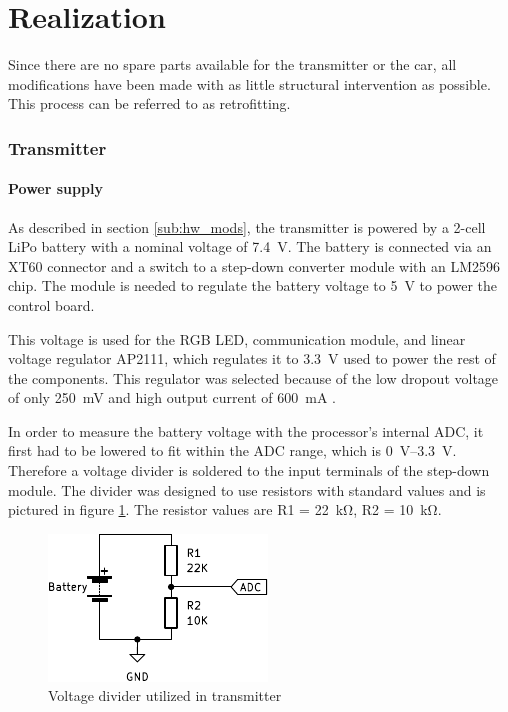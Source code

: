 


\part{Realization}
\label{chap:realization}
Since there are no spare parts available for the transmitter or the car, all modifications have been made with as little structural intervention as possible. This process can be referred to as retrofitting.

\section{Transmitter}
\label{sec:real_tx}
\subsection{Power supply}
As described in section \ref{sub:hw_mods}, the transmitter is powered by a 2-cell LiPo battery with a nominal voltage of \SI{7.4}{\V}. The battery is connected via an XT60 connector and a switch to a step-down converter module with an LM2596 chip. The module is needed to regulate the battery voltage to \SI{5}{\V} to power the control board.

This voltage is used for the RGB LED, communication module, and linear voltage regulator AP2111, which regulates it to \SI{3.3}{\V} used to power the rest of the components. This regulator was selected because of the low dropout voltage of only \SI{250}{\mV} and high output current of \SI{600}{\mA} \cite{ap_datasheet}.

In order to measure the battery voltage with the processor's internal ADC, it first had to be lowered to fit within the ADC range, which is \SIrange{0}{3.3}{\V}. Therefore a voltage divider is soldered to the input terminals of the step-down module. The divider was designed to use resistors with standard values and is pictured in figure \ref{fig:tx_div}. The resistor values are R1 = \SI{22}{\kohm}, R2 = \SI{10}{\kohm}.
\begin{figure}[h]
\centering
\includegraphics[width=0.4\linewidth]{fig/voltage_divider.pdf}
\caption{Voltage divider utilized in transmitter }
\label{fig:tx_div}
\end{figure}

